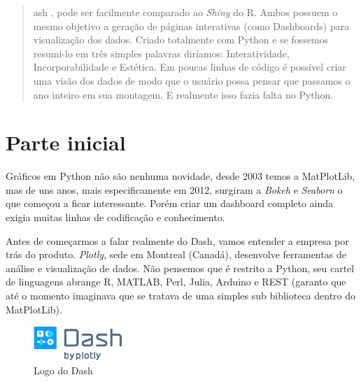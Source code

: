 \documentclass[a4paper,11pt]{article}
\begin{document}
	
	\maketitle %
	\thispagestyle{fancy} %
	
\begin{abstract}
	ash \cite{dashoficial}, pode ser facilmente comparado ao \textit{Shiny} do R. Ambos possuem o mesmo objetivo a geração de páginas interativas (como Dashboards) para visualização dos dados. Criado totalmente com Python e se fossemos resumi-lo em três simples palavras diríamos: Interatividade, Incorporabilidade e Estética. Em poucas linhas de código é possível criar uma visão dos dados de modo que o usuário possa pensar que passamos o ano inteiro em sua montagem. E realmente isso fazia falta no Python.
\end{abstract}

\section{Parte inicial}
Gráficos em Python não são nenhuma novidade, desde 2003 temos a MatPlotLib, mas de uns anos, mais especificamente em 2012, surgiram a \textit{Bokeh} e \textit{Seaborn} o que começou a ficar interessante. Porém criar um dashboard completo ainda exigia muitas linhas de codificação e conhecimento. 

Antes de começarmos a falar realmente do Dash, vamos entender a empresa por trás do produto. \textit{Plotly}, sede em Montreal (Canadá), desenvolve ferramentas de análise e visualização de dados. Não pensemos que é restrito a Python, seu cartel de linguagens abrange R, MATLAB, Perl, Julia, Arduino e REST (garanto que até o momento imaginava que se tratava de uma simples sub biblioteca dentro do MatPlotLib).
\begin{figure}[H]
	\centering
	\includegraphics[width=0.3\textwidth]{imagem/logo}
	\caption{Logo do Dash}
\end{figure}
\end{document}
